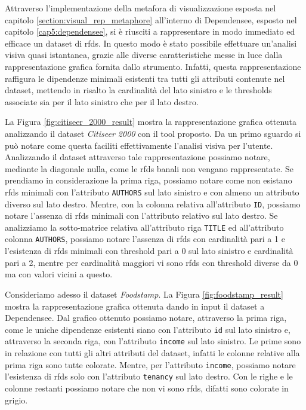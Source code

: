 Attraverso l'implementazione della metafora di visualizzazione esposta nel capitolo \ref{section:visual_rep_metaphore} all'interno di Dependensee, esposto nel capitolo \ref{cap5:dependensee}, si \`{e} riusciti a rappresentare in modo immediato ed efficace un dataset di \acrlong{rfds}. In questo modo \`{e} stato possibile effettuare un'analisi visiva quasi istantanea, grazie alle diverse caratteristiche messe in luce dalla rappresentazione grafica fornita dallo strumento. Infatti, questa rappresentazione raffigura le dipendenze minimali esistenti tra tutti gli attributi contenute nel dataset, mettendo in risalto la cardinalit\`{a} del lato sinistro e le thresholds associate sia per il lato sinistro che per il lato destro.\par
La Figura \ref{fig:citiseer_2000_result} mostra la rappresentazione grafica ottenuta analizzando il dataset \textit{Citiseer 2000} con il tool proposto. Da un primo sguardo si pu\`{o} notare come questa faciliti effettivamente l'analisi visiva per l'utente. Analizzando il dataset attraverso tale rappresentazione possiamo notare, mediante la diagonale nulla, come le \acrlong{rfds} banali non vengano rappresentate. Se prendiamo in considerazione la prima riga, possiamo notare come non esistano \acrlong{rfds} minimali con l'attributo \texttt{AUTHORS} sul lato sinistro e con almeno un attributo diverso sul lato destro. Mentre, con la colonna relativa all'attributo \texttt{ID}, possiamo notare l'assenza di \acrlong{rfds} minimali con l'attributo relativo sul lato destro. Se analizziamo la sotto-matrice relativa all'attributo riga \texttt{TITLE} ed all'attributo colonna \texttt{AUTHORS}, possiamo notare l'assenza di \acrlong{rfds} con cardinalit\`{a} pari a 1 e l'esistenza di \acrlong{rfds} minimali con threshold pari a 0 sul lato sinistro e cardinalit\`{a} pari a 2, mentre per cardinalit\`{a} maggiori vi sono \acrlong{rfds} con threshold diverse da 0 ma con valori vicini a questo.\par
Consideriamo adesso il dataset \textit{Foodstamp}. La Figura \ref{fig:foodstamp_result} mostra la rappresentazione grafica ottenuta dando in input il dataset a Dependensee. Dal grafico ottenuto possiamo notare, attraverso la prima riga, come le uniche dipendenze esistenti siano con l'attributo \texttt{id} sul lato sinistro e, attraverso la seconda riga, con l'attributo \texttt{income} sul lato sinistro. Le prime sono in relazione con tutti gli altri attributi del dataset, infatti le colonne relative alla prima riga sono tutte colorate. Mentre, per l'attributo \texttt{income}, possiamo notare l'esistenza di \acrlong{rfds} solo con l'attributo \texttt{tenancy} sul lato destro. Con le righe e le colonne restanti possiamo notare che non vi sono \acrlong{rfds}, difatti sono colorate in grigio.

